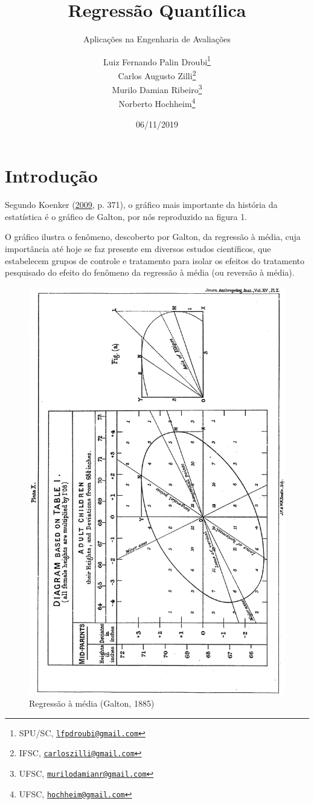 \documentclass[a4paper, 12pt]{article}
\title{Regressão Quantílica}
\subtitle{Aplicações na Engenharia de Avaliações}
\author{Luiz Fernando Palin Droubi\footnote{SPU/SC,
  \href{mailto:lfpdroubi@gmail.com}{\nolinkurl{lfpdroubi@gmail.com}}} \\ Carlos Augusto Zilli\footnote{IFSC,
  \href{mailto:carloszilli@gmail.com}{\nolinkurl{carloszilli@gmail.com}}} \\ Murilo Damian Ribeiro\footnote{UFSC,
  \href{mailto:murilodamianr@gmail.com}{\nolinkurl{murilodamianr@gmail.com}}
} \\ Norberto Hochheim\footnote{UFSC,
  \href{mailto:hochheim@gmail.com}{\nolinkurl{hochheim@gmail.com}}}}
\date{06/11/2019}
\begin{document}
\maketitle

\hypertarget{introducao}{%
\section{Introdução}\label{introducao}}

Segundo Koenker (\protect\hyperlink{ref-mim}{2009}, p. 371), o gráfico
mais importante da história da estatística é o gráfico de Galton, por
nós reproduzido na figura 1.

O gráfico ilustra o fenômeno, descoberto por Galton, da regressão à
média, cuja importância até hoje se faz presente em diversos estudos
científicos, que estabelecem grupos de controle e tratamento para isolar
os efeitos do tratamento pesquisado do efeito do fenômeno da regressão à
média (ou reversão à média).

\begin{figure}
\centering
\includegraphics{refs/image_Galton.png}
\caption{Regressão à média (Galton, 1885)}
\end{figure}
\end{document}
